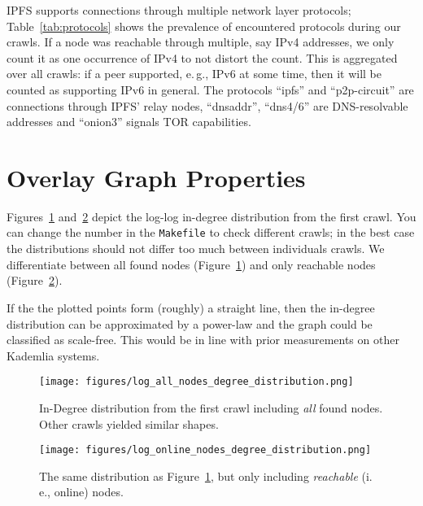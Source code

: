 \documentclass[10pt]{article}
\makeatletter
\newcommand*{\eg}{e.\,g.\@\xspace}
\newcommand*{\ie}{i.\,e.\@\xspace}
\makeatother
\begin{document}
IPFS supports connections through multiple network layer protocols; Table~\ref{tab:protocols} shows the prevalence of encountered protocols during our crawls.
If a node was reachable through multiple, say IPv4 addresses, we only count it as one occurrence of IPv4 to not distort the count.
This is aggregated over all crawls: if a peer supported, \eg, IPv6 at some time, then it will be counted as supporting IPv6 in general.
The protocols ``ipfs'' and ``p2p-circuit'' are connections through IPFS' relay nodes, ``dnsaddr'', ``dns4/6'' are DNS-resolvable addresses and ``onion3'' signals TOR capabilities.

\section{Overlay Graph Properties}
\label{sec:graph_properties}

Figures~\ref{fig:log_all_nodes_degree_distribution} and~\ref{fig:log_online_nodes_degree_distribution} depict the log-log in-degree distribution from the first crawl.
You can change the number in the \texttt{Makefile} to check different crawls; in the best case the distributions should not differ too much between individuals crawls.
We differentiate between all found nodes (Figure~\ref{fig:log_all_nodes_degree_distribution}) and only reachable nodes (Figure~\ref{fig:log_online_nodes_degree_distribution}).

If the the plotted points form (roughly) a straight line, then the in-degree distribution can be approximated by a power-law and the graph could be classified as scale-free.
This would be in line with prior measurements on other Kademlia systems.

\begin{figure}[!htb]
\centering
        \texttt{[image: figures/log\_all\_nodes\_degree\_distribution.png]}
        \caption{In-Degree distribution from the first crawl including \emph{all} found nodes. Other crawls yielded similar shapes.}
        \label{fig:log_all_nodes_degree_distribution}
\end{figure}
\begin{figure}[!htb]
        \texttt{[image: figures/log\_online\_nodes\_degree\_distribution.png]}
        \caption{The same distribution as Figure~\ref{fig:log_all_nodes_degree_distribution}, but only including \emph{reachable} (\ie, online) nodes.}
        \label{fig:log_online_nodes_degree_distribution}
\end{figure}
\end{document}
